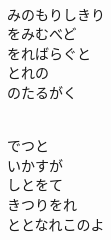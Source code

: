 \documentclass[10pt,b5j]{tarticle} %
\begin{document}
\begin{enumerate}
\begin{minipage}[c]{\blocksize}
        \vspace{\linespace}
        \item~\\
        みのもりしきり\\
        をみむべど\\
        をればらぐと\\
        とれの\\
        のたるがく
        
    \end{minipage}
    \begin{minipage}[c]{\blocksize}
        
        \vspace{\linespace}
        \item~\\
        でつと\\
        いかすが\\
        しとをて\\
        きつりをれ\\
        ととなれこのよ

    
    \end{minipage}
\end{enumerate} %
\end{document}
